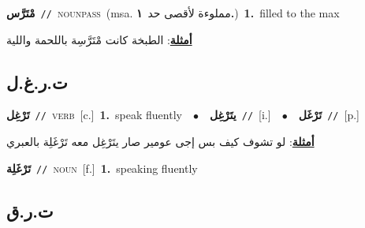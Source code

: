 \documentclass[10pt,a4paper,twoside]{article} %
\begin{document}
\begin{multicols}{2}
{{{{{{{{\setlength\topsep{0pt}\textbf{\foreignlanguage{arabic}{مْتَرَّس}}\ {\color{gray}\texttt{//}\color{black}}\ \textsc{noun\textunderscore pass}\ \color{gray}(msa. \foreignlanguage{arabic}{مملوءة لأقصى حد}~\foreignlanguage{arabic}{\textbf{١.}})\color{black}\ \textbf{1.}~filled to the max\  \begin{flushright}\color{gray}\foreignlanguage{arabic}{\textbf{\underline{\foreignlanguage{arabic}{أمثلة}}}: الطبخة كانت مْتَرَّسِة باللحمة واللية}\end{flushright}\color{black}} \vspace{2mm}

\vspace{-3mm}
\subsection*{\color{blue}\foreignlanguage{arabic}{ت.ر.غ.ل}\color{blue}{}} 

{\setlength\topsep{0pt}\textbf{\foreignlanguage{arabic}{تَرْغِل}}\ {\color{gray}\texttt{//}\color{black}}\ \textsc{verb}\ [c.]\ \textbf{1.}~speak fluently\ \ $\bullet$\ \ \setlength\topsep{0pt}\textbf{\foreignlanguage{arabic}{يتَرْغِل}}\ {\color{gray}\texttt{//}\color{black}}\ [i.]\ \ $\bullet$\ \ \setlength\topsep{0pt}\textbf{\foreignlanguage{arabic}{تَرْغَل}}\ {\color{gray}\texttt{//}\color{black}}\ [p.]\  \begin{flushright}\color{gray}\foreignlanguage{arabic}{\textbf{\underline{\foreignlanguage{arabic}{أمثلة}}}: لو تشوف كيف بس إجى عومير صار يتَرْغِل معه تَرْغَلِة بالعبري}\end{flushright}\color{black}} \vspace{2mm}

{\setlength\topsep{0pt}\textbf{\foreignlanguage{arabic}{تَرْغَلِة}}\ {\color{gray}\texttt{//}\color{black}}\ \textsc{noun}\ [f.]\ \textbf{1.}~speaking fluently\ 

\vspace{-3mm}
\subsection*{\color{blue}\foreignlanguage{arabic}{ت.ر.ق}\color{blue}{}} 

}}}}}}}}
\end{multicols}
\end{document}
